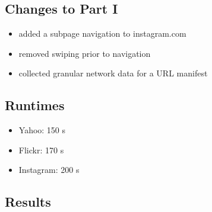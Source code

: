 \documentclass{article}
\begin{document}
\subsection{Changes to Part I}
\begin{itemize}
    \item added a subpage navigation to instagram.com
    \item removed swiping prior to navigation
    \item collected granular network data for a URL manifest
\end{itemize}

\subsection{Runtimes}
\begin{itemize}
    \item Yahoo: 150 s
    \item Flickr: 170 s
    \item Instagram: 200 s
\end{itemize}


\subsection{Results}



\end{document}
